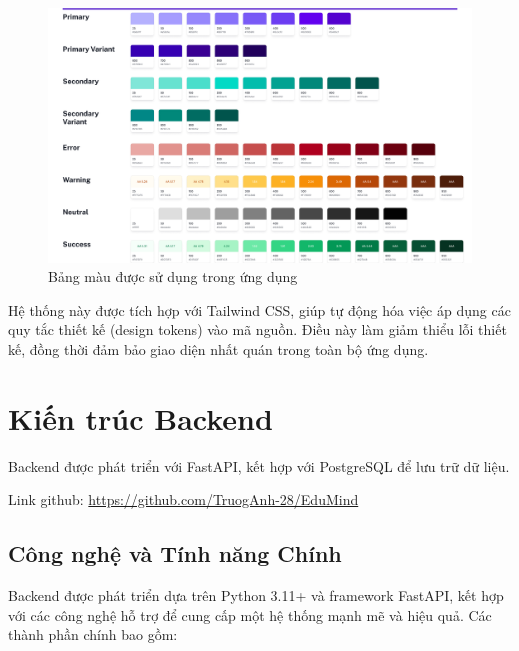\begin{figure}[H]
    \centering
    \includegraphics[scale=0.15]{Images/Implement/Colors.jpg}
    \caption{Bảng màu được sử dụng trong ứng dụng}
\end{figure}

Hệ thống này được tích hợp với Tailwind CSS, giúp tự động hóa việc áp dụng các quy tắc thiết kế (design tokens) vào mã nguồn. Điều này làm giảm thiểu lỗi thiết kế, đồng thời đảm bảo giao diện nhất quán trong toàn bộ ứng dụng.

\section{Kiến trúc Backend}

Backend được phát triển với FastAPI, kết hợp với PostgreSQL để lưu trữ dữ liệu.

Link github: \href{https://github.com/TruogAnh-28/EduMind}{https://github.com/TruogAnh-28/EduMind}

\subsection*{Công nghệ và Tính năng Chính}

Backend được phát triển dựa trên Python 3.11+ và framework FastAPI, kết hợp với các công nghệ hỗ trợ để cung cấp một hệ thống mạnh mẽ và hiệu quả. Các thành phần chính bao gồm:

